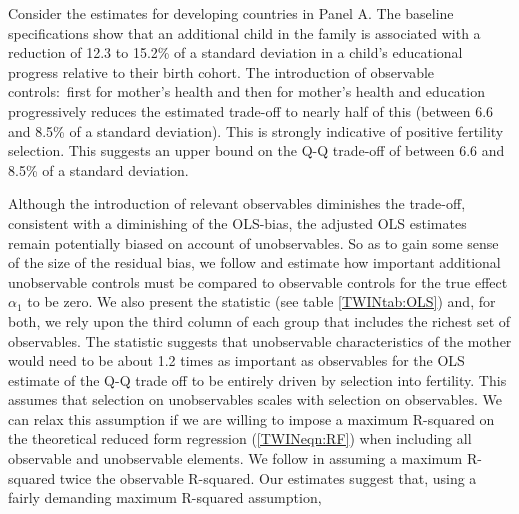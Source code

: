 \documentclass[subeqn]{article}
\begin{document}
\begin{spacing}{1.4}
Consider the estimates for developing countries in Panel A. The baseline specifications show that an additional child
in the family is associated with a reduction of 12.3 to 15.2\% of a standard
deviation in a child's educational progress relative to their birth cohort.
The introduction of observable controls:\ first for mother's health and then for
mother's health and education progressively reduces the estimated trade-off to nearly half
of this (between 6.6 and 8.5\% of a standard deviation). This is strongly indicative of positive fertility
selection. This suggests an upper bound on the Q-Q trade-off of between 6.6 and 8.5\% of a standard deviation.

Although the introduction of relevant observables diminishes the trade-off, consistent with a diminishing of the OLS-bias, the adjusted OLS estimates remain potentially biased on account of unobservables. So as to gain some sense of the size of the residual bias, we follow \citep{Altonjietal2005} and estimate how important additional
unobservable controls must be compared to observable controls for the true
effect $\alpha_1$ to be zero. We also present the \citeauthor{Oster2013} statistic (see table \ref{TWINtab:OLS}) and, for both, we rely upon the third column of each group that includes the richest set of observables. The \citeauthor{Altonjietal2005} statistic 
suggests that unobservable characteristics of the mother would need to be about
1.2 times as important as observables for the OLS estimate of the Q-Q trade off to
be entirely driven by selection into fertility. This assumes
that selection on unobservables scales with selection on observables. We
can relax this assumption if we are willing to impose a maximum R-squared on the 
theoretical reduced form regression (\ref{TWINeqn:RF}) when including all 
observable and unobservable elements. We follow \citet{Oster2013} in assuming
a maximum R-squared twice the observable R-squared.  
Our estimates suggest that, using a fairly
demanding maximum R-squared assumption, 

\end{spacing}
\end{document}
